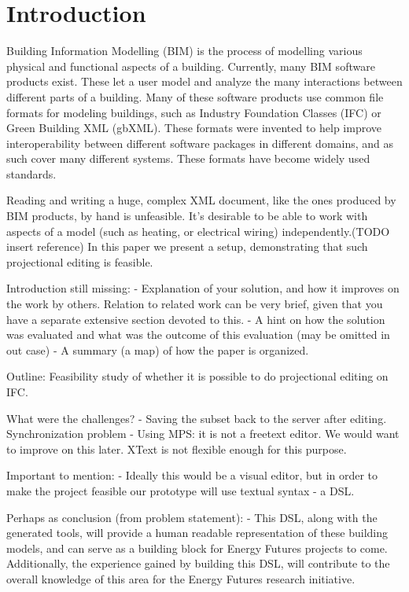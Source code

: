 \setcounter{page}{1}
\section{Introduction}
Building Information Modelling (BIM) is the process of modelling various physical and functional aspects of a building. Currently, many BIM software products exist. These let a user model and analyze the many interactions between different parts of a building. Many of these software products use common file formats for modeling buildings, such as Industry Foundation Classes (IFC) or Green Building XML (gbXML). These formats were invented to help improve interoperability between different software packages in different domains, and as such cover many different systems. These formats have become widely used standards. 

Reading and writing a huge, complex XML document, like the ones produced by BIM products, by hand is unfeasible. It’s desirable to be able to work with aspects of a model (such as heating, or electrical wiring) independently.(TODO insert reference) In this paper we present a setup, demonstrating that such projectional editing is feasible. 

Introduction still missing:
- Explanation of your solution, and how it improves on the work by others. Relation to related work can be very brief, given that you have a separate extensive section devoted to this.
- A hint on how the solution was evaluated and what was the outcome of this evaluation (may be omitted in out case)
- A summary (a map) of how the paper is organized.



Outline:
Feasibility study of whether it is possible to do projectional editing on IFC.

What were the challenges?
- Saving the subset back to the server after editing. Synchronization problem
- Using MPS: it is not a freetext editor. We would want to improve on this later. XText is not flexible enough for this purpose.

Important to mention:
- Ideally this would be a visual editor, but in order to make the project feasible our prototype will use textual syntax - a DSL. 

Perhaps as conclusion (from problem statement):
- This DSL, along with the generated tools, will provide a human readable representation of these building models, and can serve as a building block for Energy Futures projects to come. Additionally, the experience gained by building this DSL, will contribute to the overall knowledge of this area for the Energy Futures research initiative.